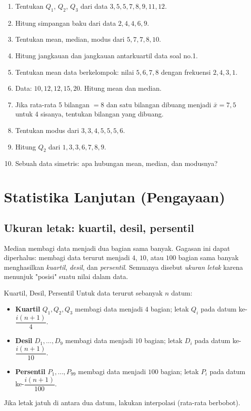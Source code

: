 \documentclass[11pt,a4paper]{report}
\theoremstyle{gaya}
\begin{document}
\begin{latihan}
\begin{enumerate}[leftmargin=*]
  \item Tentukan $Q_1$, $Q_2$, $Q_3$ dari data $3,5,5,7,8,9,11,12$.
  \item Hitung simpangan baku dari data $2,4,4,6,9$.
  \item Tentukan mean, median, modus dari $5,7,7,8,10$.
  \item Hitung jangkauan dan jangkauan antarkuartil data soal no.1.
  \item Tentukan mean data berkelompok: nilai $5,6,7,8$ dengan frekuensi $2,4,3,1$.
  \item Data: $10,12,12,15,20$. Hitung mean dan median.
  \item Jika rata-rata 5 bilangan $=8$ dan satu bilangan dibuang menjadi $\bar x=7{,}5$ untuk 4 sisanya, tentukan bilangan yang dibuang.
  \item Tentukan modus dari $3,3,4,5,5,5,6$.
  \item Hitung $Q_2$ dari $1,3,3,6,7,8,9$.
  \item Sebuah data simetris: apa hubungan mean, median, dan modusnya?
\end{enumerate}
\end{latihan}

\section{Statistika Lanjutan (Pengayaan)}

\subsection*{Ukuran letak: kuartil, desil, persentil}
Median membagi data menjadi dua bagian sama banyak. Gagasan ini dapat diperhalus: membagi data terurut menjadi $4$, $10$, atau $100$ bagian sama banyak menghasilkan \emph{kuartil}, \emph{desil}, dan \emph{persentil}. Semuanya disebut \emph{ukuran letak} karena menunjuk "posisi" suatu nilai dalam data.

\begin{konsep}{{Kuartil, Desil, Persentil}}
Untuk data terurut sebanyak $n$ datum:
\begin{itemize}[leftmargin=*,topsep=2pt]
  \item \textbf{Kuartil} $Q_1,Q_2,Q_3$ membagi data menjadi $4$ bagian; letak $Q_i$ pada datum ke-$\dfrac{i(n+1)}{4}$.
  \item \textbf{Desil} $D_1,\dots,D_9$ membagi data menjadi $10$ bagian; letak $D_i$ pada datum ke-$\dfrac{i(n+1)}{10}$.
  \item \textbf{Persentil} $P_1,\dots,P_{99}$ membagi data menjadi $100$ bagian; letak $P_i$ pada datum ke-$\dfrac{i(n+1)}{100}$.
\end{itemize}
Jika letak jatuh di antara dua datum, lakukan interpolasi (rata-rata berbobot).
\end{konsep}
\end{document}
